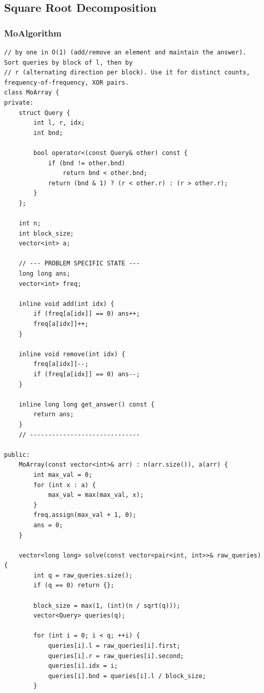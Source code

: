 \documentclass[9pt,a4paper,twocolumn]{extarticle}
\begin{document}
\subsection{Square Root Decomposition}

\filbreak
\subsubsection{MoAlgorithm}
\nopagebreak
\begin{lstlisting}
// by one in O(1) (add/remove an element and maintain the answer). Sort queries by block of l, then by
// r (alternating direction per block). Use it for distinct counts, frequency-of-frequency, XOR pairs.
class MoArray {
private:
    struct Query {
        int l, r, idx;
        int bnd; 

        bool operator<(const Query& other) const {
            if (bnd != other.bnd)
                return bnd < other.bnd;
            return (bnd & 1) ? (r < other.r) : (r > other.r);
        }
    };

    int n;
    int block_size;
    vector<int> a;

    // --- PROBLEM SPECIFIC STATE ---
    long long ans;
    vector<int> freq;

    inline void add(int idx) {
        if (freq[a[idx]] == 0) ans++;
        freq[a[idx]]++;
    }

    inline void remove(int idx) {
        freq[a[idx]]--;
        if (freq[a[idx]] == 0) ans--;
    }

    inline long long get_answer() const {
        return ans;
    }
    // ------------------------------

public:
    MoArray(const vector<int>& arr) : n(arr.size()), a(arr) {
        int max_val = 0;
        for (int x : a) {
            max_val = max(max_val, x);
        }
        freq.assign(max_val + 1, 0);
        ans = 0;
    }

    vector<long long> solve(const vector<pair<int, int>>& raw_queries) {
        int q = raw_queries.size();
        if (q == 0) return {};

        block_size = max(1, (int)(n / sqrt(q)));
        vector<Query> queries(q);
        
        for (int i = 0; i < q; ++i) {
            queries[i].l = raw_queries[i].first;
            queries[i].r = raw_queries[i].second;
            queries[i].idx = i;
            queries[i].bnd = queries[i].l / block_size;
        }


\end{lstlisting}
\end{document}
